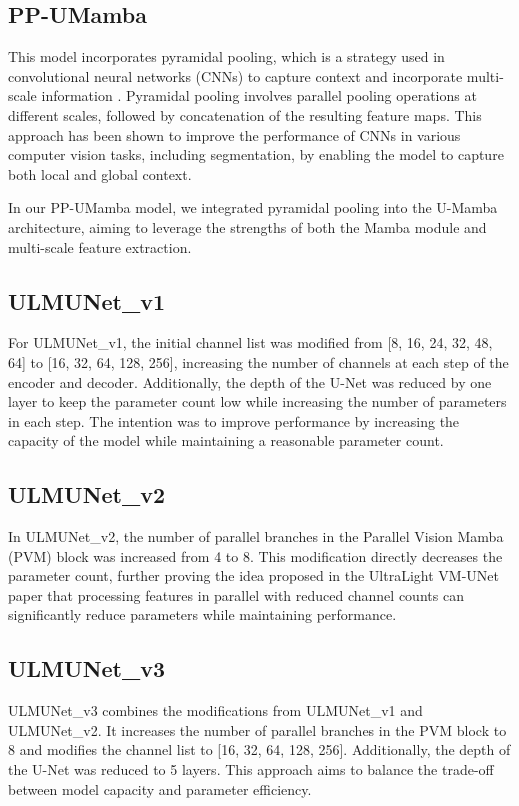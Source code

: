 \documentclass[conference]{IEEEtran}
\begin{document}
\subsection{PP-UMamba}
This model incorporates pyramidal pooling, which is a strategy used in convolutional neural networks (CNNs) to capture context and incorporate multi-scale information \cite{zhao2017pyramid}. Pyramidal pooling involves parallel pooling operations at different scales, followed by concatenation of the resulting feature maps. This approach has been shown to improve the performance of CNNs in various computer vision tasks, including segmentation, by enabling the model to capture both local and global context.

In our PP-UMamba model, we integrated pyramidal pooling into the U-Mamba architecture, aiming to leverage the strengths of both the Mamba module and multi-scale feature extraction.

\subsection{ULMUNet\_v1}
For ULMUNet\_v1, the initial channel list was modified from [8, 16, 24, 32, 48, 64] to [16, 32, 64, 128, 256], increasing the number of channels at each step of the encoder and decoder. Additionally, the depth of the U-Net was reduced by one layer to keep the parameter count low while increasing the number of parameters in each step. The intention was to improve performance by increasing the capacity of the model while maintaining a reasonable parameter count.

\subsection{ULMUNet\_v2}
In ULMUNet\_v2, the number of parallel branches in the Parallel Vision Mamba (PVM) block was increased from 4 to 8. This modification directly decreases the parameter count, further proving the idea proposed in the UltraLight VM-UNet paper \cite{ultralightvmunet} that processing features in parallel with reduced channel counts can significantly reduce parameters while maintaining performance.

\subsection{ULMUNet\_v3}
ULMUNet\_v3 combines the modifications from ULMUNet\_v1 and ULMUNet\_v2. It increases the number of parallel branches in the PVM block to 8 and modifies the channel list to [16, 32, 64, 128, 256]. Additionally, the depth of the U-Net was reduced to 5 layers. This approach aims to balance the trade-off between model capacity and parameter efficiency.
\end{document}
